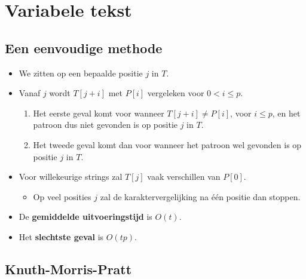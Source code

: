 \section{Variabele tekst}

\subsection{Een eenvoudige methode}
\begin{itemize}
    \item We zitten op een bepaalde positie $j$ in $T$.
    \item Vanaf $j$ wordt $T[j + i]$ met $P[i]$ vergeleken voor $0 < i \leq p$.
    \begin{enumerate}
        \item Het eerste geval komt voor wanneer $T[j + i] \neq P[i]$, voor $i \leq p$, en het patroon dus niet gevonden is op positie $j$ in $T$.
        \item Het tweede geval komt dan voor wanneer het patroon wel gevonden is op positie $j$ in $T$.
    \end{enumerate}
    \item Voor willekeurige strings zal $T[j]$ vaak verschillen van $P[0]$.
    \begin{itemize}
        \item Op veel posities $j$ zal de karaktervergelijking na één positie dan stoppen.
    \end{itemize}
    \item De \textbf{gemiddelde uitvoeringstijd} is $O(t)$.
    \item Het \textbf{slechtste geval} is $O(tp)$.
\end{itemize}



\subsection{Knuth-Morris-Pratt}
